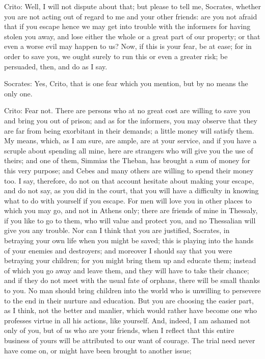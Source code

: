 Crito: Well, I will not dispute about that; but please to tell me, Socrates,
whether you are not acting out of regard to me and your other friends:
are you not afraid that if you escape hence we may get into trouble
with the informers for having stolen you away, and lose either the
whole or a great part of our property; or that even a worse evil may
happen to us? Now, if this is your fear, be at ease; for in order
to save you, we ought surely to run this or even a greater risk; be
persuaded, then, and do as I say. 

Socrates: Yes, Crito, that is one fear which you mention, but by no means
the only one. 

Crito: Fear not. There are persons who at no great cost are willing to
save you and bring you out of prison; and as for the informers, you
may observe that they are far from being exorbitant in their demands;
a little money will satisfy them. My means, which, as I am sure, are
ample, are at your service, and if you have a scruple about spending
all mine, here are strangers who will give you the use of theirs;
and one of them, Simmias the Theban, has brought a sum of money for
this very purpose; and Cebes and many others are willing to spend
their money too. I say, therefore, do not on that account hesitate
about making your escape, and do not say, as you did in the court,
that you will have a difficulty in knowing what to do with yourself
if you escape. For men will love you in other places to which you
may go, and not in Athens only; there are friends of mine in Thessaly,
if you like to go to them, who will value and protect you, and no
Thessalian will give you any trouble. Nor can I think that you are
justified, Socrates, in betraying your own life when you might be
saved; this is playing into the hands of your enemies and destroyers;
and moreover I should say that you were betraying your children; for
you might bring them up and educate them; instead of which you go
away and leave them, and they will have to take their chance; and
if they do not meet with the usual fate of orphans, there will be
small thanks to you. No man should bring children into the world who
is unwilling to persevere to the end in their nurture and education.
But you are choosing the easier part, as I think, not the better and
manlier, which would rather have become one who professes virtue in
all his actions, like yourself. And, indeed, I am ashamed not only
of you, but of us who are your friends, when I reflect that this entire
business of yours will be attributed to our want of courage. The trial
need never have come on, or might have been brought to another issue;
